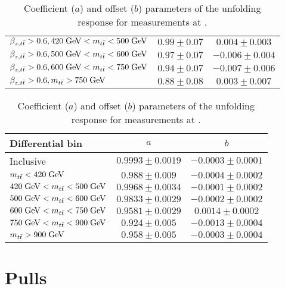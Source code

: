 \begin{table}[htbp]
\begin{center}
\begin{tabular}{l c c}
      $\beta_{z,t\bar{t}}{}>0.6, 420\; \mathrm{GeV}{}<m_{t\bar{t}}{}<500\; \mathrm{GeV}{}$& $0.99\pm0.07$  & $0.004\pm0.003$  \\
      $\beta_{z,t\bar{t}}{}>0.6, 500\; \mathrm{GeV}{}<m_{t\bar{t}}{}<600\; \mathrm{GeV}{}$& $0.97\pm0.07$  & $-0.006\pm0.004$\\
      $\beta_{z,t\bar{t}}{}>0.6, 600\; \mathrm{GeV}{}<m_{t\bar{t}}{}<750\; \mathrm{GeV}{}$& $0.94\pm0.07$ & $-0.007\pm0.006$\\
      $\beta_{z,t\bar{t}}{}>0.6, m_{t\bar{t}}{} >750\; \mathrm{GeV}{}$& $0.88\pm0.08$ & $0.003\pm0.007$\\
      \bottomrule
     \end{tabular}
   \end{center}
  \caption{Coefficient ($a$) and offset ($b$) parameters of the unfolding
    response for measurements at \seventev{}.}
  \label{tab:unf:response7tev}
\end{table}

\begin{table}[htbp]
  \begin{center}
    \begin{tabular}{l c c}
      \toprule
      Differential bin & $a$ & $b$ \\
      \midrule
      Inclusive & $0.9993\pm0.0019$ & $-0.0003\pm0.0001$\\
      \midrule
      $m_{t\bar{t}}{}<420\; \mathrm{GeV}{}$                & $0.988\pm0.009$  & $-0.0004\pm0.0002$\\
      $420\; \mathrm{GeV}{}<m_{t\bar{t}}{}<500\; \mathrm{GeV}{}$& $0.9968\pm0.0034$  & $-0.0001\pm0.0002$  \\
      $500\; \mathrm{GeV}{}<m_{t\bar{t}}{}<600\; \mathrm{GeV}{}$& $0.9833\pm0.0029$  & $-0.0002\pm0.0002$\\
      $600\; \mathrm{GeV}{}<m_{t\bar{t}}{}<750\; \mathrm{GeV}{}$& $0.9581\pm0.0029$ & $0.0014\pm0.0002$\\
      $750\; \mathrm{GeV}{}<m_{t\bar{t}}{}<900\; \mathrm{GeV}{}$& $0.924\pm0.005$ & $-0.0013\pm0.0004$\\
      $m_{t\bar{t}}{}>900\; \mathrm{GeV}{}$                & $0.958\pm0.005$ & $-0.0003\pm0.0004$\\
      \bottomrule
     \end{tabular}
   \end{center}
  \caption{Coefficient ($a$) and offset ($b$) parameters of the unfolding
    response for measurements at \eighttev{}.}
  \label{tab:unf:response8tev}
\end{table}

\section{Pulls}
\label{app:unfolding:pulls}


